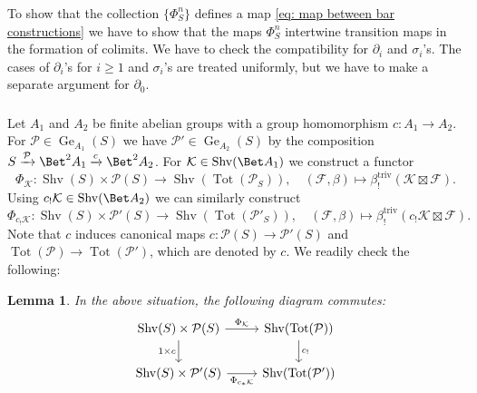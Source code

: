 \documentclass[10pt]{amsart}
\newcommand{\sssec}{\subsubsection}
\newtheorem{lemma}[subsubsection]{Lemma}
\theoremstyle{remark}
\newcommand{\pa}{\partial}
\newcommand{\cP}{\mathcal{P}}
\newcommand{\on}{\operatorname}
\newcommand{\cF}{\mathcal{F}}
\newcommand{\cK}{\mathcal{K}}
\newcommand{\Shv}{\on{Shv}}
\begin{document}
\sssec{}
To show that the collection $\{\Phi^n_S\}$ defines a map \eqref{eq: map between bar constructions} we have to show that the maps $\Phi^n_S$ intertwine transition maps in the formation of colimits. We have to check the compatibility for $\pa_i$ and $\sigma_i$'s. The cases of $\pa_i$'s for $i\ge 1$ and $\sigma_i$'s are treated uniformly, but we have to make a separate argument for $\pa_0$.

\sssec{}
Let $A_1$ and $A_2$ be finite abelian groups with a group homomorphism $c:A_1\rightarrow A_2$. For $\cP\in\on{Ge}_{A_1}(S)$ we have $\cP'\in \on{Ge}_{A_2}(S)$ by the composition $S\xrightarrow{\cP} \Bet^2 A_1\xrightarrow{c} \Bet^2 A_2$. For $\cK\in \Shv(\Bet A_1)$ we construct a functor
\[\Phi_{\cK}:\Shv(S)\times\cP(S)\rightarrow \Shv(\on{Tot}(\cP_S)),\quad (\cF,\beta)\mapsto \beta^{\on{triv}}_{!}(\cK\boxtimes\cF).\]
Using $c_!\cK \in \Shv(\Bet A_2)$ we can similarly construct
\[\Phi_{c_!\cK}:\Shv(S)\times\cP'(S)\rightarrow \Shv(\on{Tot}(\cP'_S)),\quad (\cF,\beta)\mapsto \beta^{\on{triv}}_{!}(c_!\cK\boxtimes\cF).\]
Note that $c$ induces canonical maps $c:\cP(S)\rightarrow \cP'(S)$ and $\on{Tot}(\cP)\rightarrow \on{Tot}(\cP')$, which are denoted by $c$. We readily check the following:

\begin{lemma}\label{lem: Phi map and change of group}
    In the above situation, the following diagram commutes:
    \[\begin{tikzcd}
	{\Shv(S)\times\cP(S)} & {\Shv(\on{Tot}(\cP))} \\
	{\Shv(S)\times \cP'(S)} & {\Shv(\on{Tot}(\cP'))}
	\arrow["{\Phi_{\cK}}", from=1-1, to=1-2]
	\arrow["{1\times c}"', from=1-1, to=2-1]
	\arrow["{c_!}", from=1-2, to=2-2]
	\arrow["{\Phi_{c_*\cK}}"', from=2-1, to=2-2]
\end{tikzcd}\]
\end{lemma}
\end{document}
